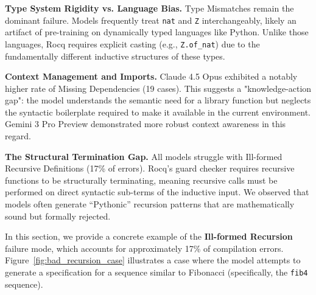 \textbf{Type System Rigidity vs. Language Bias.}
Type Mismatches remain the dominant failure. Models frequently treat \texttt{nat} and \texttt{Z} interchangeably, likely an artifact of pre-training on dynamically typed languages like Python. Unlike those languages, Rocq requires explicit casting (e.g., \texttt{Z.of\_nat}) due to the fundamentally different inductive structures of these types.

\textbf{Context Management and Imports.}
Claude 4.5 Opus exhibited a notably higher rate of Missing Dependencies (19 cases). This suggests a "knowledge-action gap": the model understands the semantic need for a library function but neglects the syntactic boilerplate required to make it available in the current environment. Gemini 3 Pro Preview demonstrated more robust context awareness in this regard.

\textbf{The Structural Termination Gap.}
All models struggle with Ill-formed Recursive Definitions (17\% of errors). Rocq's guard checker requires recursive functions to be structurally terminating, meaning recursive calls must be performed on direct syntactic sub-terms of the inductive input. We observed that models often generate ``Pythonic'' recursion patterns that are mathematically sound but formally rejected. 

In this section, we provide a concrete example of the \textbf{Ill-formed Recursion} failure mode, which accounts for approximately 17\% of compilation errors. Figure~\ref{fig:bad_recursion_case} illustrates a case where the model attempts to generate a specification for a sequence similar to Fibonacci (specifically, the \texttt{fib4} sequence).


